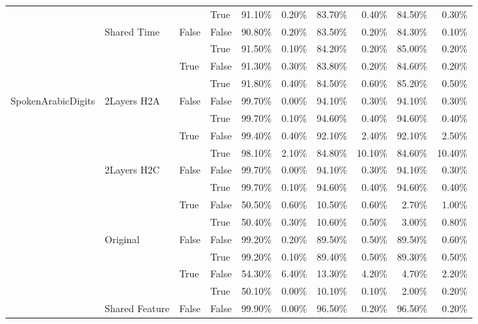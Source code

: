 \begin{tabular}{llllrrrrrr}
 &  &  & True & 91.10\% & 0.20\% & 83.70\% & 0.40\% & 84.50\% & 0.30\% \\
\cline{2-10} \cline{3-10}
 & \multirow[t]{4}{*}{Shared Time} & \multirow[t]{2}{*}{False} & False & 90.80\% & 0.20\% & 83.50\% & 0.20\% & 84.30\% & 0.10\% \\
 &  &  & True & 91.50\% & 0.10\% & 84.20\% & 0.20\% & 85.00\% & 0.20\% \\
\cline{3-10}
 &  & \multirow[t]{2}{*}{True} & False & 91.30\% & 0.30\% & 83.80\% & 0.20\% & 84.60\% & 0.20\% \\
 &  &  & True & 91.80\% & 0.40\% & 84.50\% & 0.60\% & 85.20\% & 0.50\% \\
\cline{1-10} \cline{2-10} \cline{3-10}
\multirow[t]{20}{*}{SpokenArabicDigits} & \multirow[t]{4}{*}{2Layers H2A} & \multirow[t]{2}{*}{False} & False & 99.70\% & 0.00\% & 94.10\% & 0.30\% & 94.10\% & 0.30\% \\
 &  &  & True & 99.70\% & 0.10\% & 94.60\% & 0.40\% & 94.60\% & 0.40\% \\
\cline{3-10}
 &  & \multirow[t]{2}{*}{True} & False & 99.40\% & 0.40\% & 92.10\% & 2.40\% & 92.10\% & 2.50\% \\
 &  &  & True & 98.10\% & 2.10\% & 84.80\% & 10.10\% & 84.60\% & 10.40\% \\
\cline{2-10} \cline{3-10}
 & \multirow[t]{4}{*}{2Layers H2C} & \multirow[t]{2}{*}{False} & False & 99.70\% & 0.00\% & 94.10\% & 0.30\% & 94.10\% & 0.30\% \\
 &  &  & True & 99.70\% & 0.10\% & 94.60\% & 0.40\% & 94.60\% & 0.40\% \\
\cline{3-10}
 &  & \multirow[t]{2}{*}{True} & False & 50.50\% & 0.60\% & 10.50\% & 0.60\% & 2.70\% & 1.00\% \\
 &  &  & True & 50.40\% & 0.30\% & 10.60\% & 0.50\% & 3.00\% & 0.80\% \\
\cline{2-10} \cline{3-10}
 & \multirow[t]{4}{*}{Original} & \multirow[t]{2}{*}{False} & False & 99.20\% & 0.20\% & 89.50\% & 0.50\% & 89.50\% & 0.60\% \\
 &  &  & True & 99.20\% & 0.10\% & 89.40\% & 0.50\% & 89.30\% & 0.50\% \\
\cline{3-10}
 &  & \multirow[t]{2}{*}{True} & False & 54.30\% & 6.40\% & 13.30\% & 4.20\% & 4.70\% & 2.20\% \\
 &  &  & True & 50.10\% & 0.00\% & 10.10\% & 0.10\% & 2.00\% & 0.20\% \\
\cline{2-10} \cline{3-10}
 & \multirow[t]{4}{*}{Shared Feature} & \multirow[t]{2}{*}{False} & False & 99.90\% & 0.00\% & 96.50\% & 0.20\% & 96.50\% & 0.20\% \\

\end{tabular}
